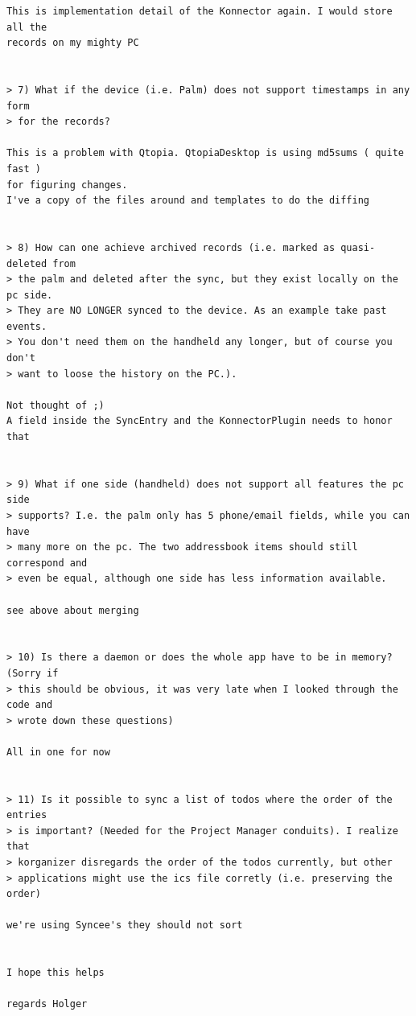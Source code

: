 \documentclass[10pt,a4paper]{article}
\begin{document}
{\begin{verbatim}
This is implementation detail of the Konnector again. I would store all the 
records on my mighty PC


> 7) What if the device (i.e. Palm) does not support timestamps in any form
> for the records?

This is a problem with Qtopia. QtopiaDesktop is using md5sums ( quite fast ) 
for figuring changes.
I've a copy of the files around and templates to do the diffing


> 8) How can one achieve archived records (i.e. marked as quasi-deleted from
> the palm and deleted after the sync, but they exist locally on the pc side.
> They are NO LONGER synced to the device. As an example take past events.
> You don't need them on the handheld any longer, but of course you don't
> want to loose the history on the PC.).

Not thought of ;)
A field inside the SyncEntry and the KonnectorPlugin needs to honor that


> 9) What if one side (handheld) does not support all features the pc side
> supports? I.e. the palm only has 5 phone/email fields, while you can have
> many more on the pc. The two addressbook items should still correspond and
> even be equal, although one side has less information available.

see above about merging


> 10) Is there a daemon or does the whole app have to be in memory? (Sorry if
> this should be obvious, it was very late when I looked through the code and
> wrote down these questions)

All in one for now


> 11) Is it possible to sync a list of todos where the order of the entries
> is important? (Needed for the Project Manager conduits). I realize that
> korganizer disregards the order of the todos currently, but other
> applications might use the ics file corretly (i.e. preserving the order)

we're using Syncee's they should not sort


I hope this helps

regards Holger
\end{verbatim}
}


\end{document}

